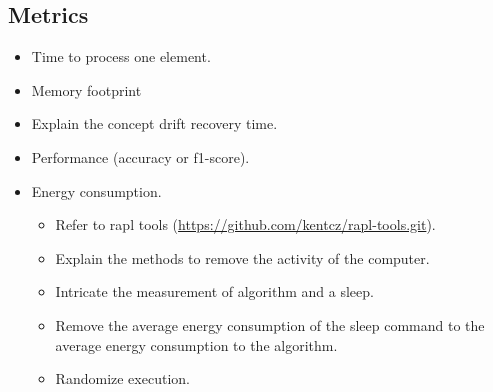 \subsection{Metrics}
\begin{itemize}
	\item Time to process one element.
	\item Memory footprint
	\item Explain the concept drift recovery time.
	\item Performance (accuracy or f1-score).
	\item Energy consumption.
	\begin{itemize}
		\item Refer to rapl tools (\url{https://github.com/kentcz/rapl-tools.git}).
		\item Explain the methods to remove the activity of the computer.
		\item Intricate the measurement of algorithm and a sleep.
		\item Remove the average energy consumption of the sleep command to the average energy consumption to the algorithm.
		\item Randomize execution.
	\end{itemize}
\end{itemize}

